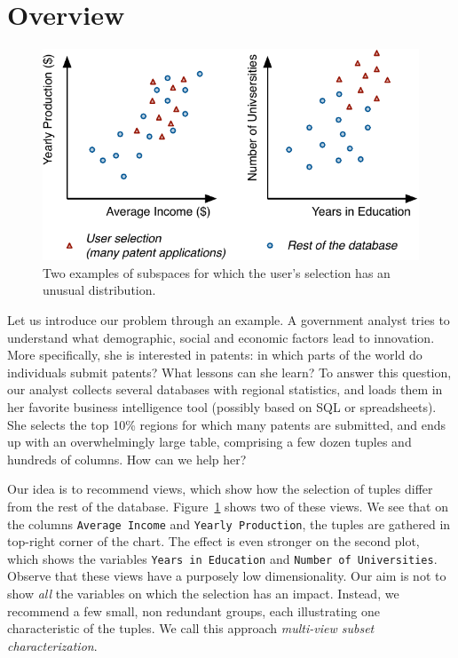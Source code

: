 \section{Overview}
\label{sec:genoverview}
\begin{figure}
  \centering
  \includegraphics[width=\columnwidth]{Figures/Example}
  \caption{Two examples of subspaces for which the user's selection has an
  unusual distribution.}
  \label{pic:example}
\end{figure}
Let us introduce our problem through an example. A government analyst tries to
understand what demographic, social and economic factors lead to innovation.
More specifically, she is interested in patents: in which parts of the world do
individuals submit patents? What lessons can she learn? To answer this
question, our analyst collects several databases with regional statistics, and
loads them in her favorite business intelligence tool (possibly based on SQL or
spreadsheets). She selects the top 10\% regions for which many patents are
submitted, and ends up with an overwhelmingly large table, comprising a few
dozen tuples and hundreds of columns. How can we help her?
 
Our idea is to recommend views, which show how the selection of tuples differ
from the rest of the database. Figure~\ref{pic:example} shows two of these
views. We see that on the columns \texttt{Average Income} and \texttt{Yearly
Production}, the tuples are gathered in top-right corner of the chart. The
effect is even stronger on the second plot, which shows the variables
\texttt{Years in Education} and \texttt{Number of Universities}. Observe that
these views have a purposely low dimensionality. Our aim is not to show
\emph{all} the variables on which the selection has an impact. Instead, we
recommend a few small, non redundant groups, each illustrating one
characteristic of the tuples. We call this approach \emph{multi-view subset
characterization}.

